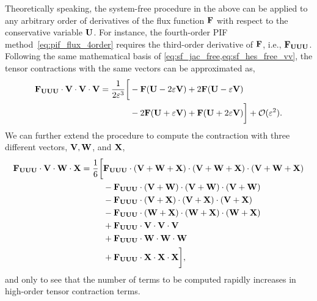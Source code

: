 Theoretically speaking, the system-free procedure in the above
can be applied to any arbitrary order of derivatives of the flux function \( \mathbf{F} \)
with respect to the conservative variable \( \mathbf{U} \). For instance,
the fourth-order PIF method~\cref{eq:pif_flux_4order}
requires the third-order derivative of \( \mathbf{F} \), i.e., \( \mathbf{F}_{\mathbf{U}\mathbf{U}\mathbf{U}} \).
Following the same mathematical basis of \cref{eq:sf_jac_free,eq:sf_hes_free_vv},
the tensor contractions with the same vectors can be approximated as,
\begin{equation}\label{eq:sf_don_free_vvv}
    \begin{split}
        \mathbf{F}_{\mathbf{U} \mathbf{U} \mathbf{U}} \cdot \mathbf{V} \cdot \mathbf{V} \cdot \mathbf{V} = \frac{1}{2 \varepsilon^{3}}
        \bigg[& -\mathbf{F}(\mathbf{U} - 2 \varepsilon \mathbf{V}) + 2\mathbf{F}(\mathbf{U} - \varepsilon \mathbf{V}) \\
              & - 2\mathbf{F}(\mathbf{U} + \varepsilon \mathbf{V})+ \mathbf{F}(\mathbf{U} + 2 \varepsilon \mathbf{V})
        \bigg] + \mathcal{O} ( \varepsilon^{2} ).
    \end{split}
\end{equation}
We can further extend the procedure to compute the contraction
with three different vectors, \( \mathbf{V}, \mathbf{W} \), and \( \mathbf{X} \),
\begin{equation}\label{eq:sf_don_free_vwx}
    \begin{split}
        \mathbf{F}_{\mathbf{U} \mathbf{U} \mathbf{U}} \cdot \mathbf{V} \cdot \mathbf{W} \cdot \mathbf{X} = \frac{1}{6} \bigg[
            &\mathbf{F}_{\mathbf{U} \mathbf{U} \mathbf{U}} \cdot \left( \mathbf{V} + \mathbf{W} + \mathbf{X} \right) \cdot \left( \mathbf{V} + \mathbf{W} + \mathbf{X} \right) \cdot \left( \mathbf{V} + \mathbf{W} + \mathbf{X} \right) \\
            & -\mathbf{F}_{\mathbf{U} \mathbf{U} \mathbf{U}} \cdot \left( \mathbf{V} + \mathbf{W} \right) \cdot \left( \mathbf{V} + \mathbf{W} \right) \cdot \left( \mathbf{V} + \mathbf{W} \right) \\
            & -\mathbf{F}_{\mathbf{U} \mathbf{U} \mathbf{U}} \cdot \left( \mathbf{V} + \mathbf{X} \right) \cdot \left( \mathbf{V} + \mathbf{X} \right) \cdot \left( \mathbf{V} + \mathbf{X} \right) \\
            & -\mathbf{F}_{\mathbf{U} \mathbf{U} \mathbf{U}} \cdot \left( \mathbf{W} + \mathbf{X} \right) \cdot \left( \mathbf{W} + \mathbf{X} \right) \cdot \left( \mathbf{W} + \mathbf{X} \right) \\
            & + \mathbf{F}_{\mathbf{U} \mathbf{U} \mathbf{U}} \cdot \mathbf{V} \cdot \mathbf{V} \cdot \mathbf{V} \\
            & + \mathbf{F}_{\mathbf{U} \mathbf{U} \mathbf{U}} \cdot \mathbf{W} \cdot \mathbf{W} \cdot \mathbf{W} \\
            & + \mathbf{F}_{\mathbf{U} \mathbf{U} \mathbf{U}} \cdot \mathbf{X} \cdot \mathbf{X} \cdot \mathbf{X}
        \bigg],
    \end{split}
\end{equation}
and only to see that the number of terms to be computed 
rapidly increases in high-order tensor contraction terms.




